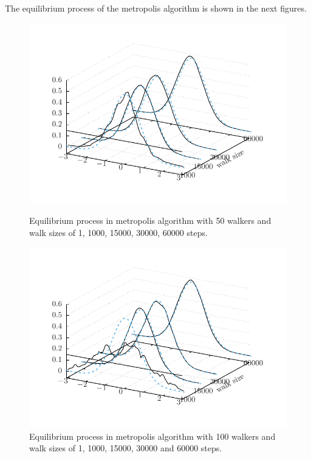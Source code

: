 \documentclass[11pt]{article}
\begin{document}
The equilibrium process of the metropolis algorithm is shown in the next figures.
\begin{figure}[H]
  \centering
  \includegraphics[width=.8\linewidth]{metropolisEquilibrium-gaussian50}
  \caption{Equilibrium process in metropolis algorithm with 50 walkers and walk sizes of 1, 1000, 15000, 30000, 60000 steps.}
\label{fig:metropolisEquilibrium-gaussian50}

  \includegraphics[width=.8\linewidth]{metropolisEquilibrium-gaussian100}
  \caption{Equilibrium process in metropolis algorithm with 100 walkers and walk sizes of 1, 1000, 15000, 30000 and 60000 steps.}
\label{fig:metropolisEquilibrium-gaussian100}
\end{figure}
\end{document}

